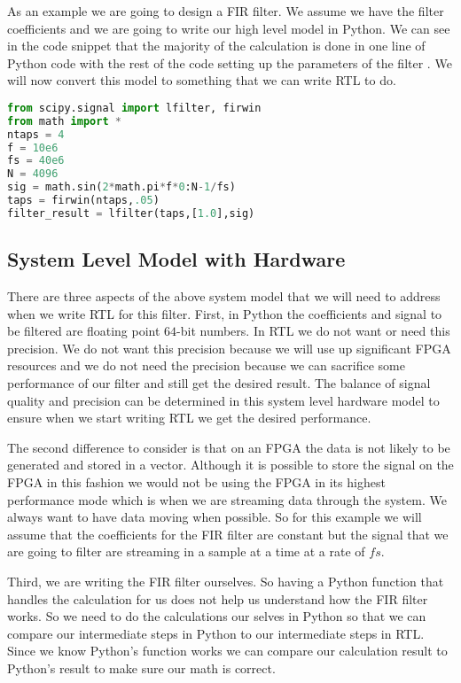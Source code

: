 As an example we are going to design a \ac{FIR} filter. We assume we have the filter coefficients and we are going to write our high level model in Python. We can see in the code snippet that the majority of the calculation is done in one line of Python code with the rest of the code setting up the parameters of the filter \cite{scipyref}. We will now convert this model to something that we can write \ac{RTL} to do.

\begin{lstlisting}[language=Python]
from scipy.signal import lfilter, firwin
from math import *
ntaps = 4
f = 10e6
fs = 40e6
N = 4096
sig = math.sin(2*math.pi*f*0:N-1/fs)
taps = firwin(ntaps,.05)
filter_result = lfilter(taps,[1.0],sig)
\end{lstlisting}
	
\subsection{System Level Model with Hardware}

There are three aspects of the above system model that we will need to address when we write \ac{RTL} for this filter. First, in Python the coefficients and signal to be filtered are floating point $64$-bit numbers. In \ac{RTL} we do not want or need this precision. We do not want this precision because we will use up significant \ac{FPGA} resources and we do not need the precision because we can sacrifice some performance of our filter and still get the desired result. The balance of signal quality and precision can be determined in this system level hardware model to ensure when we start writing \ac{RTL} we get the desired performance.

The second difference to consider is that on an \ac{FPGA} the data is not likely to be generated and stored in a vector. Although it is possible to store the signal on the \ac{FPGA} in this fashion we would not be using the \ac{FPGA} in its highest performance mode which is when we are streaming data through the system. We always want to have data moving when possible. So for this example we will assume that the coefficients for the \ac{FIR} filter are constant but the signal that we are going to filter are streaming in a sample at a time at a rate of $fs$.

Third, we are writing the \ac{FIR} filter ourselves. So having a Python function that handles the calculation for us does not help us understand how the \ac{FIR} filter works. So we need to do the calculations our selves in Python so that we can compare our intermediate steps in Python to our intermediate steps in \ac{RTL}. Since we know Python's function works we can compare our calculation result to Python's result to make sure our math is correct.

